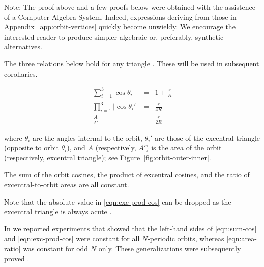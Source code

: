 
Note: The proof above and a few proofs below were obtained with the  assistence of   a Computer Algebra System. Indeed, expressions deriving from those in Appendix~\ref{app:orbit-vertices} quickly become unwieldy. We encourage the interested reader to produce simpler algebraic or, preferably, synthetic alternatives.

The three relations below hold for any triangle \cite{johnson29}. These will be used in subsequent corollaries.

\begin{eqnarray}
\sum_{i=1}^{3}{\cos\theta_i}&=&1+\frac{r}{R} \label{eqn:sum-cos} \\
\prod_{i=1}^{3}{|\cos\theta_i'|}&=&\frac{r}{4R} \label{eqn:exc-prod-cos} \\
\frac{A}{A'}&=&\frac{r}{2R}
\label{eqn:area-ratio}
\end{eqnarray}

\noindent where $\theta_i$ are the angles internal to the orbit, $\theta_i'$ are those of the excentral triangle (opposite to orbit $\theta_i$), and $A$ (respectively, $A'$) is the area of the orbit (respectively, excentral triangle); see Figure~\ref{fig:orbit-outer-inner}.

\begin{corollary}
The sum of the orbit cosines, the product of excentral cosines, and the ratio of excentral-to-orbit areas are all constant.
\end{corollary}

Note that the absolute value in \eqref{eqn:exc-prod-cos} can be dropped as the excentral triangle is always acute \cite{coxeter67}.

In \cite{reznik2019-intelligencer} we reported experiments that showed that the left-hand sides of \eqref{eqn:sum-cos} and \eqref{eqn:exc-prod-cos} were constant for all $N$-periodic orbits, whereas \eqref{eqn:area-ratio} was constant for odd $N$ only. These generalizations were subsequently proved \cite{akopyan2020-invariants,bialy2020-invariants}.

